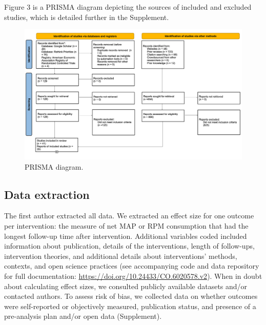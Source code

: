 \documentclass[sn-nature,referee,pdflatex]{sn-jnl}
\begin{document}
Figure 3 is a PRISMA diagram depicting the sources of included and
excluded studies, which is detailed further in the Supplement.

\begin{figure}[H]

{\centering \includegraphics[width=1.2\linewidth,]{./figures/prisma-diagram} 

}

\caption{PRISMA diagram.}\label{fig:prisma_diagram}
\end{figure}

\subsection{Data extraction}\label{sec3.3}

The first author extracted all data. We extracted an effect size for one
outcome per intervention: the measure of net MAP or RPM consumption that
had the longest follow-up time after intervention. Additional variables
coded included information about publication, details of the
interventions, length of follow-ups, intervention theories, and
additional details about interventions' methods, contexts, and open
science practices (see accompanying code and data repository for full
documentation: \url{https://doi.org/10.24433/CO.6020578.v2}). When in
doubt about calculating effect sizes, we consulted publicly available
datasets and/or contacted authors. To assess risk of bias, we collected
data on whether outcomes were self-reported or objectively measured,
publication status, and presence of a pre-analysis plan and/or open data
(Supplement).
\end{document}
